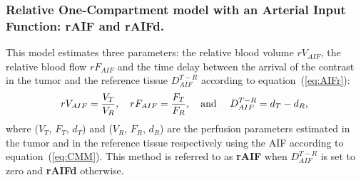 \subsubsection{Relative One-Compartment model with an Arterial Input Function: \textbf{rAIF and rAIFd}.}
\label{sec:rAIFmodel}
This model estimates three parameters: the relative blood volume $rV_{AIF}$, the relative blood flow $rF_{AIF}$  and the  time delay between the arrival of the contrast in the tumor and the reference tissue $D^{T-R}_{AIF}$ according to equation~(\ref{eq:AIFr}):
\begin{equation}
rV_{AIF} = \frac {V_T} {V_{R}}, \quad rF_{AIF} = \frac {F_T} {F_{R}}, \quad \textrm{and } \quad D^{T-R}_{AIF} = d_T - d_{R},\\
\label{eq:AIFr}
\end{equation}
where ($V_T$, $F_T$, $d_T$) and ($V_{R}$, $F_{R}$,  $d_{R}$)  are the perfusion parameters estimated in the tumor and in the reference tissue respectively using the AIF according to equation~(\ref{eq:CMM}).
This method is referred to as \textbf{rAIF} when $D^{T-R}_{AIF} $ is set to zero and \textbf{rAIFd} otherwise. 

